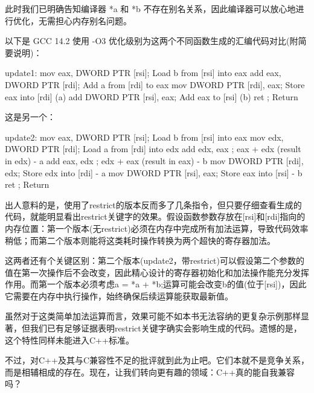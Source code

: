 此时我们已明确告知编译器 *a 和 *b 不存在别名关系，因此编译器可以放心地进行优化，无需担心内存别名问题。

以下是 GCC 14.2 使用 -O3 优化级别为这两个不同函数生成的汇编代码对比(附简要说明)：

\begin{shell}
update1:
  mov eax, DWORD PTR [rsi]; Load b from [rsi] into eax
  add eax, DWORD PTR [rdi]; Add a from [rdi] to eax
  mov DWORD PTR [rdi], eax; Store eax into [rdi] (a)
  add DWORD PTR [rsi], eax; Add eax to [rsi] (b)
  ret ; Return
\end{shell}

这是另一个：

\begin{shell}
update2:
  mov eax, DWORD PTR [rsi]; Load b from [rsi] into eax
  mov edx, DWORD PTR [rdi]; Load a from [rdi] into edx
  add edx, eax ; eax + edx (result in edx) - a
  add eax, edx ; edx + eax (result in eax) - b
  mov DWORD PTR [rdi], edx; Store edx into [rdi] - a
  mov DWORD PTR [rsi], eax; Store eax into [rsi] - b
  ret ; Return
\end{shell}

出人意料的是，使用了restrict的版本反而多了几条指令，但只要仔细查看生成的代码，就能明显看出restrict关键字的效果。假设函数参数存放在[rsi]和[rdi]指向的内存位置：第一个版本(无restrict)必须在内存中完成所有加法运算，导致代码效率稍低；而第二个版本则能将这类耗时操作转换为两个超快的寄存器加法。

这两者还有个关键区别：第二个版本(update2，带restrict)可以假设第二个参数的值在第一次操作后不会改变，因此精心设计的寄存器初始化和加法操作能充分发挥作用。而第一个版本必须考虑a = *a + *b;运算可能会改变b的值(位于[rsi])，因此它需要在内存中执行操作，始终确保后续运算能获取最新值。

虽然对于这类简单加法运算而言，效果可能不如本书无法容纳的更复杂示例那样显著，但我们已有足够证据表明restrict关键字确实会影响生成的代码。遗憾的是，这个特性同样未能进入C++标准。

不过，对C++及其与C兼容性不足的批评就到此为止吧。它们本就不是竞争关系，而是相辅相成的存在。现在，让我们转向更有趣的领域：C++真的能自我兼容吗？











